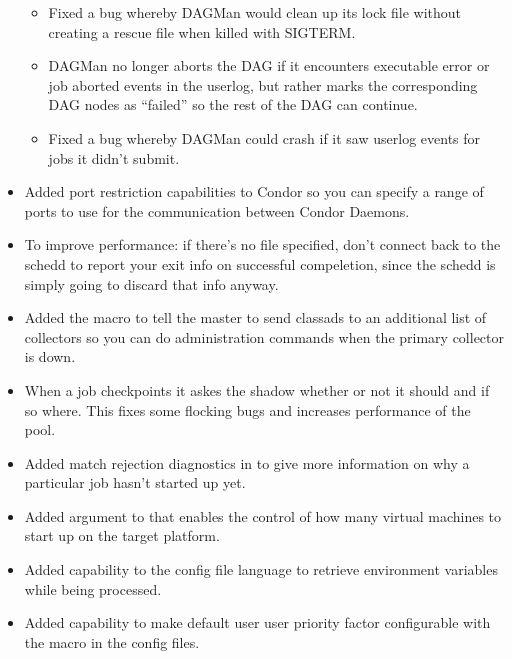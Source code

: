 \begin{itemize}
\begin{itemize}
\item
Fixed a bug whereby DAGMan would clean up its lock file without
creating a rescue file when killed with SIGTERM.

\item
DAGMan no longer aborts the DAG if it encounters executable error or
job aborted events in the userlog, but rather marks the corresponding
DAG nodes as ``failed'' so the rest of the DAG can continue.

\item
Fixed a bug whereby DAGMan could crash if it saw userlog events for
jobs it didn't submit.

\end{itemize}

\item Added port restriction capabilities to Condor so you can specify a range
of ports to use for the communication between Condor Daemons.

\item To improve performance: if there's no  file
specified, don't connect back to the schedd to report your exit info on
successful compeletion, since the schedd is simply going to discard that
info anyway.

\item Added the macro  to tell the
master to send classads to an additional list of collectors so you can
do administration commands when the primary collector is down.

\item When a job checkpoints it askes the shadow whether or not it
should and if so where. This fixes some flocking bugs and increases
performance of the pool.

\item Added match rejection diagnostics in   to
give more information on why a particular job hasn't started up yet.

\item Added  argument to  that enables the
control of how many virtual machines to start up on the target platform.

\item Added capability to the config file language to retrieve environment
variables while being processed.

\item Added capability to make default user user priority factor configurable
with the  macro in the config files.


\end{itemize}
